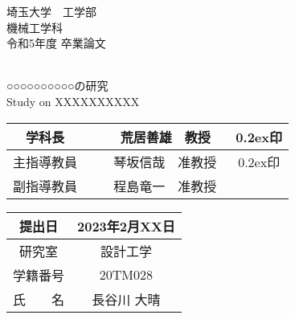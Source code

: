 \thispagestyle{empty}
\newcommand{\ctext}[1]{\textcolor[rgb]{0.65, 0.65, 0.65}{\raise0.2ex\hbox{\textcircled{\scriptsize{#1}}}}}
\begin{center}
        {\huge 埼玉大学　工学部} \\
        {\huge 機械工学科} \\        
        \vspace{10mm}
        {\Huge 令和5年度 \quad 卒業論文}\\
        \vspace{10mm}　
        
        {\Huge ○○○○○○○○○○の研究} \\
        \vspace{10mm}
        {\LARGE Study on XXXXXXXXXX} \\        
        \vspace{35mm} %
 \end{center}
        
 \begin{table}[!h]
        \begin{flushright}        
        \renewcommand{\arraystretch}{1.5}
        \begin{tabular}{|c|cc|}
            \hline
            {\Large 学科長}    & {\Large　 荒居善雄　教授　\quad} & {\Large\ctext{印}}\\        
            \hline
            {\Large 主指導教員} & {\Large　 琴坂信哉　准教授　} &{\Large\ctext{印}}\\
            \hline
            {\Large 副指導教員} & {\Large　 程島竜一　准教授　}& \\
            \hline
        \end{tabular}
        \renewcommand{\arraystretch}{1.0}        
    \end{flushright}        
 \end{table}
\begin{table}[!b]
        \begin{flushright}
        \renewcommand{\arraystretch}{1.2}
        \begin{tabular}{|c|c|}
            \hline
             {\Large 提出日} & {\Large 2023年2月XX日}\\ %
             \hline
             {\Large 研究室} & {\Large 設計工学 }\\
             \hline
             {\Large 学籍番号} & {\Large 20TM028}\\
             \hline
             {\Large 氏　　名} & {\Large 長谷川 大晴}\\
            \hline
        \end{tabular}
        \renewcommand{\arraystretch}{1.0}
        \end{flushright}
\end{table}

